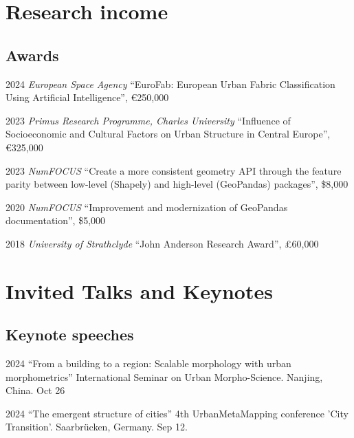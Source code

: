 \documentclass[12pt,a4paper]{report}
\begin{document}
    \section*{Research income}

    \subsection*{Awards}

    \begin{tablist}

        \item[2024] \tab{}\textit{European Space Agency} \enquote{EuroFab: European Urban Fabric Classification Using Artificial Intelligence}, €250,000
        \item[2023] \tab{}\textit{Primus Research Programme, Charles University} \enquote{Influence of Socioeconomic and Cultural Factors on Urban Structure in Central Europe}, €325,000
        \item[2023] \tab{}\textit{NumFOCUS} \enquote{Create a more consistent geometry API through the feature parity between low-level (Shapely) and high-level (GeoPandas) packages}, \$8,000
        \item[2020] \tab{}\textit{NumFOCUS} \enquote{Improvement and modernization of GeoPandas documentation}, \$5,000
        \item[2018] \tab{}\textit{University of Strathclyde} \enquote{John Anderson Research Award}, £60,000

    \end{tablist}

    \section*{Invited Talks and Keynotes}

    \subsection*{Keynote speeches}

    \begin{tablist}

        \item[2024] \tab{}\enquote{From a building to a region: Scalable morphology with urban morphometrics} International Seminar on Urban Morpho-Science. Nanjing, China. Oct 26
        \item[2024] \tab{}\enquote{The emergent structure of cities} 4th UrbanMetaMapping conference 'City Transition'. Saarbrücken, Germany. Sep 12.

    \end{tablist}
\end{document}
